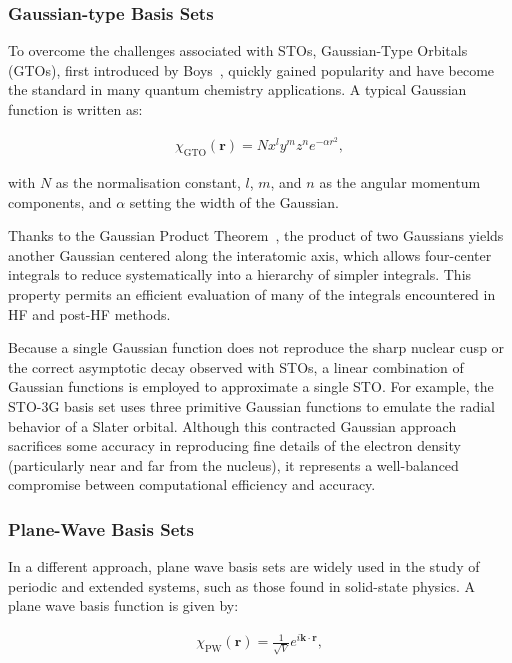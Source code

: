 \subsubsection{Gaussian-type Basis Sets}

To overcome the challenges associated with \glspl{STO}, Gaussian-Type Orbitals
(\glspl{GTO}), first introduced by Boys~\cite{boys1950}, quickly gained
popularity and have become the standard in many quantum chemistry applications.
A typical Gaussian function is written as:

\begin{align}
  \chi_{\mathrm{GTO}}(\mathbf{r}) = N x^l y^m z^n e^{-\alpha r^2},
\end{align}

\noindent with $N$ as the normalisation constant, $l$, $m$, and $n$ as the
angular momentum components, and $\alpha$ setting the width of the Gaussian.

Thanks to the Gaussian Product Theorem~\cite{Besal2011}, the product of two
Gaussians yields another Gaussian centered along the interatomic axis, which
allows four-center integrals to reduce systematically into a hierarchy of
simpler integrals. This property permits an efficient evaluation of many of the
integrals encountered in \gls{HF} and post-HF methods.

Because a single Gaussian function does not reproduce the sharp nuclear cusp or
the correct asymptotic decay observed with \glspl{STO}, a linear combination of
Gaussian functions is employed to approximate a single \gls{STO}. For example,
the STO-3G basis set uses three primitive Gaussian functions to emulate the
radial behavior of a Slater orbital. Although this contracted Gaussian approach
sacrifices some accuracy in reproducing fine details of the electron density
(particularly near and far from the nucleus), it represents a well-balanced
compromise between computational efficiency and accuracy.

\newpage
\subsubsection{Plane-Wave Basis Sets}

In a different approach, plane wave basis sets are widely used in the study of
periodic and extended systems, such as those found in solid-state physics. A
plane wave basis function is given by:

\begin{align}
  \chi_{\mathrm{PW}}(\mathbf{r}) = \frac1{\sqrt{V}} e^{i \mathbf{k} \cdot \mathbf{r}},
\end{align}

